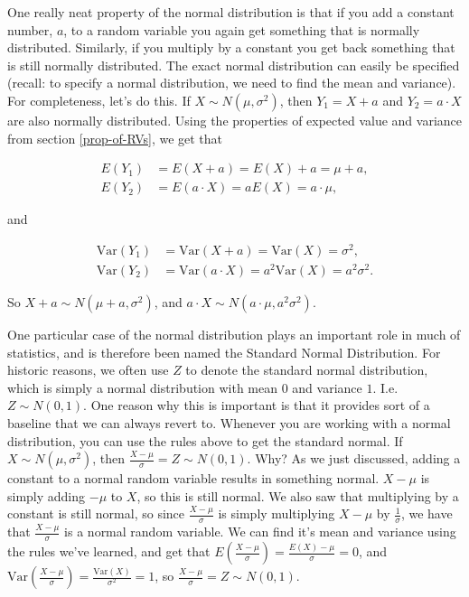 \documentclass[]{book}
\theoremstyle{definition}
\theoremstyle{definition}
\theoremstyle{definition}
\theoremstyle{remark}
\begin{document}
One really neat property of the normal distribution is that if you add a constant number, \(a\), to a random variable you again get something that is normally distributed. Similarly, if you multiply by a constant you get back something that is still normally distributed. The exact normal distribution can easily be specified (recall: to specify a normal distribution, we need to find the mean and variance). For completeness, let's do this. If \(X \sim N(\mu, \sigma^2)\), then \(Y_1 = X+a\) and \(Y_2 = a\cdot X\) are also normally distributed. Using the properties of expected value and variance from section \ref{prop-of-RVs}, we get that

\begin{align*}
  E(Y_1) &= E(X+a) = E(X) + a = \mu + a, \\
  E(Y_2) &= E(a\cdot X) = a E(X) = a\cdot \mu,
\end{align*}

and

\begin{align*}
  \text{Var}(Y_1) &= \text{Var}(X+a) = \text{Var}(X) = \sigma^2, \\
  \text{Var}(Y_2) &= \text{Var}(a\cdot X) = a^2 \text{Var}(X) = a^2 \sigma^2.
\end{align*}

So \(X + a \sim N(\mu + a, \sigma^2)\), and \(a\cdot X \sim N(a\cdot \mu, a^2 \sigma^2)\).

One particular case of the normal distribution plays an important role in much of statistics, and is therefore been named the Standard Normal Distribution. For historic reasons, we often use \(Z\) to denote the standard normal distribution, which is simply a normal distribution with mean \(0\) and variance \(1\). I.e. \(Z \sim N(0,1)\). One reason why this is important is that it provides sort of a baseline that we can always revert to. Whenever you are working with a normal distribution, you can use the rules above to get the standard normal. If \(X \sim N(\mu, \sigma^2)\), then \(\frac{X-\mu}{\sigma} = Z \sim N(0,1)\). Why? As we just discussed, adding a constant to a normal random variable results in something normal. \(X-\mu\) is simply adding \(-\mu\) to \(X\), so this is still normal. We also saw that multiplying by a constant is still normal, so since \(\frac{X-\mu}{\sigma}\) is simply multiplying \(X-\mu\) by \(\frac{1}{\sigma}\), we have that \(\frac{X-\mu}{\sigma}\) is a normal random variable. We can find it's mean and variance using the rules we've learned, and get that \(E\left(\frac{X - \mu}{\sigma}\right) = \frac{E(X) - \mu}{\sigma} = 0\), and \(\text{Var}\left(\frac{X - \mu}{\sigma}\right) = \frac{\text{Var}(X)}{\sigma^2} = 1\), so \(\frac{X-\mu}{\sigma} = Z \sim N(0,1)\).
\end{document}
